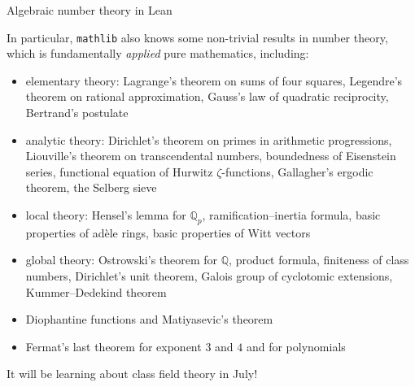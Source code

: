 \documentclass[10pt]{beamer}
\begin{document}
\begin{frame}[t]{Algebraic number theory in Lean}

In particular, \texttt{mathlib} also knows some non-trivial results in number theory, which is fundamentally \emph{applied} pure mathematics, including:
\begin{itemize}
\item elementary theory: Lagrange's theorem on sums of four squares, Legendre's theorem on rational approximation, Gauss's law of quadratic reciprocity, Bertrand's postulate

\pause

\item analytic theory: Dirichlet's theorem on primes in arithmetic progressions, Liouville's theorem on transcendental numbers, boundedness of Eisenstein series, functional equation of Hurwitz $ \zeta $-functions, Gallagher's ergodic theorem, the Selberg sieve

\pause

\item local theory: Hensel's lemma for $ \mathbb{Q}_p $, ramification--inertia formula, basic properties of ad\`ele rings, basic properties of Witt vectors

\pause

\item global theory: Ostrowski's theorem for $ \mathbb{Q} $, product formula, finiteness of class numbers, Dirichlet's unit theorem, Galois group of cyclotomic extensions, Kummer--Dedekind theorem

\pause

\item Diophantine functions and Matiyasevic's theorem
\item Fermat's last theorem for exponent $ 3 $ and $ 4 $ and for polynomials
\end{itemize}

\pause

It will be learning about class field theory in July!

\end{frame}
\end{document}
